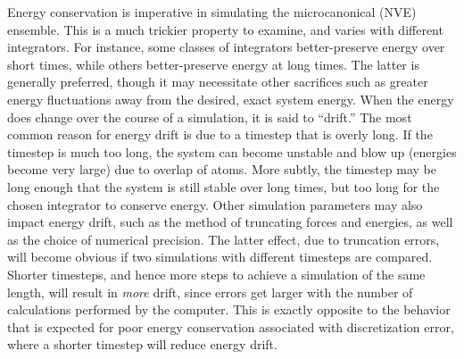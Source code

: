 \documentclass[9pt,bestpractices]{livecoms}
\begin{document}
Energy conservation is imperative in simulating the microcanonical (NVE) ensemble.
This is a much trickier property to examine, and varies with different integrators.
For instance, some classes of integrators better-preserve energy over short times, while others better-preserve energy at long times.
The latter is generally preferred, though it may necessitate other sacrifices such as greater energy fluctuations away from the desired, exact system energy.
When the energy does change over the course of a simulation, it is said to ``drift.''
The most common reason for energy drift is due to a timestep that is overly long.
If the timestep is much too long, the system can become unstable and blow up (energies become very large) due to overlap of atoms.
More subtly, the timestep may be long enough that the system is still stable over long times, but too long for the chosen integrator to conserve energy.
Other simulation parameters may also impact energy drift, such as the method of truncating forces and energies, as well as the choice of numerical precision.
The latter effect, due to truncation errors, will become obvious if two simulations with different timesteps are compared.
Shorter timesteps, and hence more steps to achieve a simulation of the same length, will result in \textit{more} drift, since errors get larger with the number of calculations performed by the computer.
This is exactly opposite to the behavior that is expected for poor energy conservation associated with discretization error, where a shorter timestep will reduce energy drift.
\end{document}
